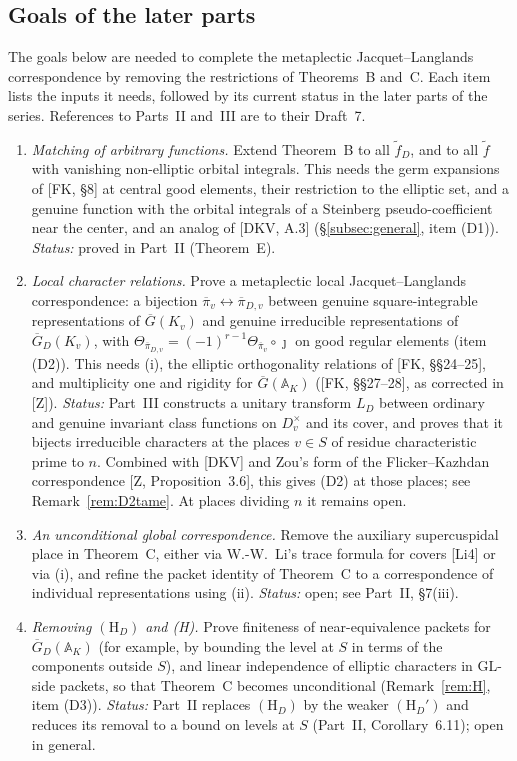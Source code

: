 \documentclass[12pt]{article}
\newcommand{\ov}[1]{\overline{#1}}
\newcommand{\A}{\mathbb{A}}
\newcommand{\GL}{\mathrm{GL}}
\newcommand{\Gb}{\ov{G}}
\newcommand{\GDb}{\ov{G}_D}
\newcommand{\pib}{\ov{\pi}}
\newcommand{\jj}{\jmath}
\theoremstyle{plain}
\theoremstyle{definition}
\begin{document}
\subsection{Goals of the later parts}\label{subsec:partII}
The goals below are needed to complete the metaplectic Jacquet--Langlands correspondence by removing the restrictions of Theorems~B and~C. Each item lists the inputs it needs, followed by its current status in the later parts of the series. References to Parts~II and~III are to their Draft~7.
\begin{enumerate}[label=(\roman*)]
\item \emph{Matching of arbitrary functions.} Extend Theorem~B to all $\tilde f_D$, and to all $\tilde f$ with vanishing non-elliptic orbital integrals. This needs the germ expansions of [FK, \S8] at central good elements, their restriction to the elliptic set, and a genuine function with the orbital integrals of a Steinberg pseudo-coefficient near the center, and an analog of [DKV, A.3] (\S\ref{subsec:general}, item (D1)). \emph{Status:} proved in Part~II (Theorem~E).
\item \emph{Local character relations.} Prove a metaplectic local Jacquet--Langlands correspondence: a bijection $\pib_v\leftrightarrow\pib_{D,v}$ between genuine square-integrable representations of $\Gb(K_v)$ and genuine irreducible representations of $\GDb(K_v)$, with $\Theta_{\pib_{D,v}}=(-1)^{r-1}\Theta_{\pib_v}\circ\jj$ on good regular elements (item (D2)). This needs (i), the elliptic orthogonality relations of [FK, \S\S24--25], and multiplicity one and rigidity for $\Gb(\A_K)$ ([FK, \S\S27--28], as corrected in [Z]). \emph{Status:} Part~III constructs a unitary transform $L_D$ between ordinary and genuine invariant class functions on $D_v^\times$ and its cover, and proves that it bijects irreducible characters at the places $v\in S$ of residue characteristic prime to $n$. Combined with [DKV] and Zou's form of the Flicker--Kazhdan correspondence [Z, Proposition~3.6], this gives (D2) at those places; see Remark~\ref{rem:D2tame}. At places dividing $n$ it remains open.
\item \emph{An unconditional global correspondence.} Remove the auxiliary supercuspidal place in Theorem~C, either via W.-W.~Li's trace formula for covers [Li4] or via (i), and refine the packet identity of Theorem~C to a correspondence of individual representations using (ii). \emph{Status:} open; see Part~II, \S7(iii).
\item \emph{Removing $(\mathrm H_D)$ and (H).} Prove finiteness of near-equivalence packets for $\GDb(\A_K)$ (for example, by bounding the level at $S$ in terms of the components outside $S$), and linear independence of elliptic characters in $\GL$-side packets, so that Theorem~C becomes unconditional (Remark~\ref{rem:H}, item (D3)). \emph{Status:} Part~II replaces $(\mathrm H_D)$ by the weaker $(\mathrm H_D')$ and reduces its removal to a bound on levels at $S$ (Part~II, Corollary~6.11); open in general.

\end{enumerate}
\end{document}
